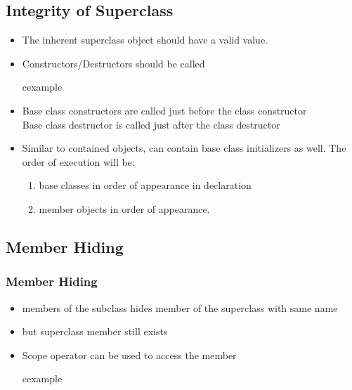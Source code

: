 \subsection{Integrity of Superclass}
\begin{frame}
\small
\begin{itemize}
\item The inherent superclass object should have a valid value.
\item Constructors/Destructors should be called
\begin{beamercolorbox}{cexample}
\codeInhCons
\end{beamercolorbox}
\item
	Base class constructors are called just before the class constructor\\
	Base class destructor is called just after the class destructor\\
\item Similar to contained objects, 
can contain base class initializers as well. The order of execution
will be:
\begin{enumerate}
\item base classes in order of appearance in declaration
\item member objects in order of appearance.
\end{enumerate}

\end{itemize}
\end{frame}

\subsection{Member Hiding}
\begin{frame}
\frametitle{Member Hiding}
\begin{itemize}
\item members of the subclass hides member of the superclass with same name
\item but superclass member still exists
\item Scope operator can be used to access the member
\begin{beamercolorbox}{cexample}
\codeInhHide
\end{beamercolorbox}
\end{itemize}
\end{frame}


